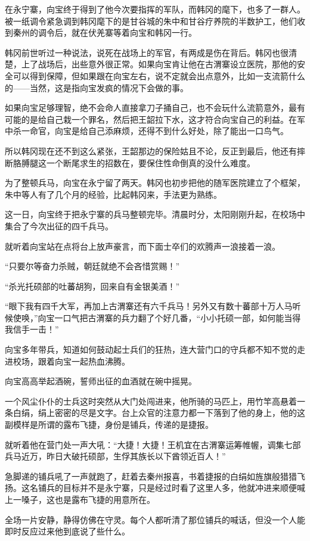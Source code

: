 在永宁寨，向宝终于得到了他今次要指挥的军队，而韩冈的麾下，也多了一群人。被一纸调令紧急调到韩冈麾下的是甘谷城的朱中和甘谷疗养院的半数护工，他们收到秦州的调令后，就在伏羌寨等着向宝和韩冈一行。

韩冈前世听过一种说法，说死在战场上的军官，有两成是伤在背后。韩冈也很清楚，上了战场后，出些意外很正常。如果向宝肯让他在古渭寨设立医院，那他的安全可以得到保障，但如果跟在向宝左右，说不定就会出点意外，比如一支流箭什么的——当然，这是指向宝发疯的情况下会做的事。

如果向宝足够理智，绝不会命人直接拿刀子捅自己，也不会玩什么流箭意外，最有可能的是给自己栽一个罪名，然后把王韶拉下水，这才符合向宝自己的利益。在军中杀一命官，向宝是给自己添麻烦，还得不到什么好处，除了能出一口鸟气。

所以韩冈现在还不到这么紧张，王韶那边的保险姑且不论，反正到最后，他还有摔断胳膊腿这一个断尾求生的招数在，要保住性命倒真的没什么难度。

为了整顿兵马，向宝在永宁留了两天。韩冈也初步把他的随军医院建立了个框架，朱中等人有了几个月的经验，比起韩冈来，手法更为熟练。

这一日，向宝终于把永宁寨的兵马整顿完毕。清晨时分，太阳刚刚升起，在校场中集合了今次出征的四千兵马。

就听着向宝站在点将台上放声豪言，而下面士卒们的欢腾声一浪接着一浪。

“只要尔等奋力杀贼，朝廷就绝不会吝惜赏赐！”

“杀光托硕部的吐蕃胡狗，回来自有金银美酒！”

“眼下我有四千大军，再加上古渭寨还有六千兵马！另外又有数十蕃部十万人马听候使唤，”向宝一口气把古渭寨的兵力翻了个好几番，“小小托硕一部，如何能当得我信手一击！”

向宝多年带兵，知道如何鼓动起士兵们的狂热，连大营门口的守兵都不知不觉的走进校场，跟着向宝一起热血沸腾。

向宝高高举起酒碗，誓师出征的血酒就在碗中摇晃。

一个风尘仆仆的士兵这时突然从大门处闯进来，他所骑的马匹上，用竹竿高悬着一条白绢，绢上密密的尽是文字。台上众官的注意力都一下落到了他的身上，他的这副模样是所谓的露布飞捷，身份是铺兵，传递的是捷报。

就听着他在营门处一声大吼：“大捷！大捷！王机宜在古渭寨运筹帷幄，调集七部兵马近万，昨日大破托硕部，生俘其族长以下酋领近百人！”

急脚递的铺兵吼了一声就跑了，赶着去秦州报喜，书着捷报的白绢如旌旗般猎猎飞扬。这名铺兵的目标并不是永宁寨，只是经过时看了这里人多，他就冲进来顺便喊上一嗓子，这也是露布飞捷的用意所在。

全场一片安静，静得仿佛在守灵。每个人都听清了那位铺兵的喊话，但没一个人能即时反应过来他到底说了些什么。

